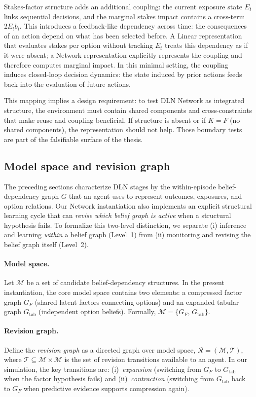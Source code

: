 \documentclass[11pt]{article}
\begin{document}
Stakes-factor structure adds an additional coupling: the current exposure state $E_t$ links sequential decisions, and the marginal stakes impact contains a cross-term $2E_tb_i$. This introduces a feedback-like dependency across time: the consequences of an action depend on what has been selected before. A Linear representation that evaluates stakes per option without tracking $E_t$ treats this dependency as if it were absent; a Network representation explicitly represents the coupling and therefore computes marginal impact. In this minimal setting, the coupling induces closed-loop decision dynamics: the state induced by prior actions feeds back into the evaluation of future actions.

This mapping implies a design requirement: to test DLN Network as integrated structure, the environment must contain shared components and cross-constraints that make reuse and coupling beneficial. If structure is absent or if $K=F$ (no shared components), the representation should not help. Those boundary tests are part of the falsifiable surface of the thesis.




\subsection{Model space and revision graph}\label{sec:model_space}

The preceding sections characterize DLN stages by the within-episode
belief-dependency graph $G$ that an agent uses to represent outcomes, exposures,
and option relations.  Our Network instantiation also implements an explicit
structural learning cycle that can \emph{revise which belief graph is active}
when a structural hypothesis fails.  To formalize this two-level distinction, we
separate (i) inference and learning \emph{within} a belief graph (Level~1) from
(ii) monitoring and revising the belief graph itself (Level~2).

\paragraph{Model space.}
Let $\mathcal{M}$ be a set of candidate belief-dependency structures.  In the
present instantiation, the core model space contains two elements:
a compressed factor graph $G_F$ (shared latent factors connecting options) and
an expanded tabular graph $G_{\mathrm{tab}}$ (independent option beliefs).
Formally, $\mathcal{M}=\{G_F,\,G_{\mathrm{tab}}\}$.

\paragraph{Revision graph.}
Define the \emph{revision graph} as a directed graph over model space,
$\mathcal{R}=(\mathcal{M},\mathcal{T})$, where $\mathcal{T}\subseteq
\mathcal{M}\times\mathcal{M}$ is the set of revision transitions available to an
agent.  In our simulation, the key transitions are:
(i)~\emph{expansion} (switching from $G_F$ to $G_{\mathrm{tab}}$ when the factor
hypothesis fails) and (ii)~\emph{contraction} (switching from $G_{\mathrm{tab}}$
back to $G_F$ when predictive evidence supports compression again).
\end{document}
